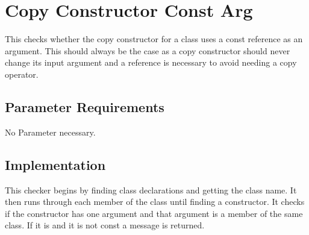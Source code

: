 %
%

\section{Copy Constructor Const Arg}
\label{CopyConstructorConstArg::overview}

This checks whether the copy constructor for a class uses a
 const reference as an argument.  This should always be the
 case as a copy constructor should never change its input
 argument and a reference is necessary to avoid needing a copy operator.            

\subsection{Parameter Requirements}

   No Parameter necessary.

\subsection{Implementation}

   This checker begins by finding class declarations and getting the
   class name.  It then runs through
 each member of the class until finding a constructor.  It checks if
 the constructor has one argument and                                 
that argument is a member of the same class.  If it is and it is not
const a message is returned.

